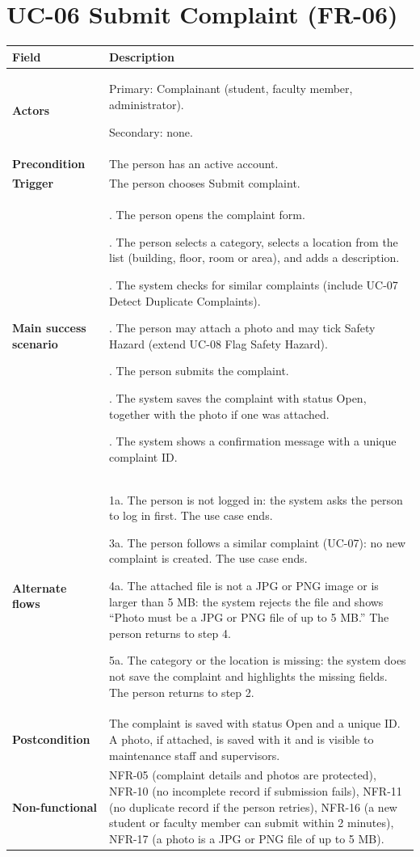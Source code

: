 \documentclass[11pt,a4paper]{report}
\begin{document}
\section{UC-06 Submit Complaint (FR-06)}
\begin{longtable}{|>{\raggedright\arraybackslash}p{3.0cm}|>{\raggedright\arraybackslash}p{12.4cm}|}
\hline \textbf{Field} & \textbf{Description} \\ \hline \endhead
\textbf{Actors} & Primary: Complainant (student, faculty member, administrator).\par\smallskip Secondary: none. \\ \hline
\textbf{Precondition} & The person has an active account. \\ \hline
\textbf{Trigger} & The person chooses Submit complaint. \\ \hline
\textbf{Main success scenario} & 1. The person opens the complaint form.\par\smallskip 2. The person selects a category, selects a location from the list (building, floor, room or area), and adds a description.\par\smallskip 3. The system checks for similar complaints (include UC-07 Detect Duplicate Complaints).\par\smallskip 4. The person may attach a photo and may tick Safety Hazard (extend UC-08 Flag Safety Hazard).\par\smallskip 5. The person submits the complaint.\par\smallskip 6. The system saves the complaint with status Open, together with the photo if one was attached.\par\smallskip 7. The system shows a confirmation message with a unique complaint ID. \\ \hline
\textbf{Alternate flows} & 1a. The person is not logged in: the system asks the person to log in first. The use case ends.\par\smallskip 3a. The person follows a similar complaint (UC-07): no new complaint is created. The use case ends.\par\smallskip 4a. The attached file is not a JPG or PNG image or is larger than 5 MB: the system rejects the file and shows ``Photo must be a JPG or PNG file of up to 5 MB.'' The person returns to step 4.\par\smallskip 5a. The category or the location is missing: the system does not save the complaint and highlights the missing fields. The person returns to step 2. \\ \hline
\textbf{Postcondition} & The complaint is saved with status Open and a unique ID. A photo, if attached, is saved with it and is visible to maintenance staff and supervisors. \\ \hline
\textbf{Non-functional} & NFR-05 (complaint details and photos are protected), NFR-10 (no incomplete record if submission fails), NFR-11 (no duplicate record if the person retries), NFR-16 (a new student or faculty member can submit within 2 minutes), NFR-17 (a photo is a JPG or PNG file of up to 5 MB). \\ \hline
\end{longtable}
\end{document}
